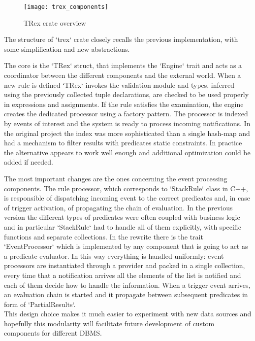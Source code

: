 \begin{figure}[h]
  \centering
  \texttt{[image: trex\_components]}
  \caption{TRex crate overview}
\end{figure}

The structure of `trex` crate closely recalls the previous implementation, with some simplification and new abstractions.

The core is the `TRex` struct, that implements the `Engine` trait and acts as a coordinator between the different components and the external world. When a new rule is defined `TRex` invokes the validation module and types, inferred using the previously collected tuple declarations, are checked to be used properly in expressions and assignments. If the rule satisfies the examination, the engine creates the dedicated processor using a factory pattern. The processor is indexed by events of interest and the system is ready to process incoming notifications. In the original project the index was more sophisticated than a single hash-map and had a mechanism to filter results with predicates static constraints. In practice the alternative appears to work well enough and additional optimization could be added if needed.

The most important changes are the ones concerning the event processing components. The rule processor, which corresponds to `StackRule` class in C++, is responsible of dispatching incoming event to the correct predicates and, in case of trigger activation, of propagating the chain of evaluation. In the previous version the different types of predicates were often coupled with business logic and in particular `StackRule` had to handle all of them explicitly, with specific functions and separate collections. In the rewrite there is the trait `EventProcessor` which is implemented by any component that is going to act as a predicate evaluator. In this way everything is handled uniformly: event processors are instantiated through a provider and packed in a single collection, every time that a notification arrives all the elements of the list is notified and each of them decide how to handle the information. When a trigger event arrives, an evaluation chain is started and it propagate between subsequent predicates in form of `PartialResults`.\\
This design choice makes it much easier to experiment with new data sources and hopefully this modularity will facilitate future development of custom components for different DBMS.

